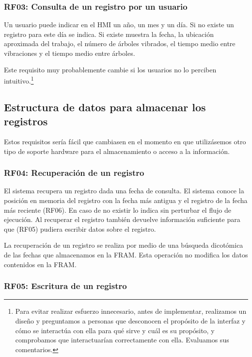 \subsubsection{RF03: Consulta de un registro por un usuario}

Un usuario puede indicar en el HMI un año, un mes y un día.
Si no existe un registro para este día se indica.
Si existe muestra la fecha, la ubicación aproximada del trabajo,
el número de árboles vibrados, el tiempo medio entre vibraciones
y el tiempo medio entre árboles.

Este requisito muy probablemente cambie si los usuarios no
lo perciben intuitivo.\footnote{
    Para evitar realizar esfuerzo innecesario, antes de implementar,
    realizamos un diseño y preguntamos a personas que desconocen
    el propósito de la interfaz y cómo se interactúa con ella para
    qué sirve y cuál es su propósito, y comprobamos que interactuarían
    correctamente con ella. Evaluamos sus comentarios.
}

\subsection{Estructura de datos para almacenar los registros}

Estos requisitos sería fácil que cambiasen en el momento en que
utilizásemos otro tipo de soporte hardware para el almacenamiento
o acceso a la información.

\subsubsection{RF04: Recuperación de un registro}

El sistema recupera un registro dada una fecha de consulta.
El sistema conoce la posición en memoria del registro con la fecha
más antigua y el registro de la fecha más reciente (RF06).
En caso de no existir lo indica sin perturbar el flujo de ejecución.
Al recuperar el registro también devuelve información suficiente para
que (RF05) pudiera escribir datos sobre el registro.

La recuperación de un registro se realiza por medio de una búsqueda
dicotómica de las fechas que almacenamos en la FRAM.
Esta operación no modifica los datos contenidos en la FRAM.

\subsubsection{RF05: Escritura de un registro}

